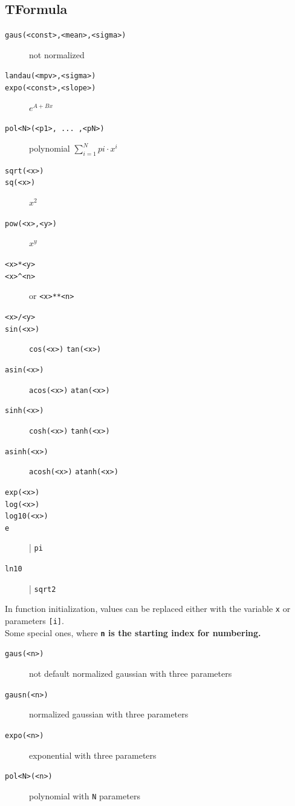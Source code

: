 \documentclass[10pt, twoside]{article}
\newcommand{\ttt}[1]{\colorbox{boxgray}{\texttt{#1}}}
\begin{document}
\subsection*{TFormula}
\begin{description}
\item[\ttt{gaus(<const>,<mean>,<sigma>)}] not normalized
\item[\ttt{landau(<mpv>,<sigma>)}]
\item[\ttt{expo(<const>,<slope>)}] $\displaystyle e^{A + Bx}$
\item[\ttt{pol<N>(<p1>, ... ,<pN>)}] polynomial $\displaystyle \sum_{i=1}^N pi \cdot x^i$ 
\item[\ttt{sqrt(<x>)}]
\item[\ttt{sq(<x>)}] $x^2$
\item[\ttt{pow(<x>,<y>)}] $x^y$
\item[\ttt{<x>*<y>}]
\item[\ttt{<x>\textasciicircum <n>}] or \ttt{<x>**<n>}
\item[\ttt{<x>/<y>}]
\item[\ttt{sin(<x>)}] \ttt{cos(<x>)} \ttt{tan(<x>)}
\item[\ttt{asin(<x>)}] \ttt{acos(<x>)} \ttt{atan(<x>)}
\item[\ttt{sinh(<x>)}] \ttt{cosh(<x>)} \ttt{tanh(<x>)}
\item[\ttt{asinh(<x>)}] \ttt{acosh(<x>)} \ttt{atanh(<x>)}
\item[\ttt{exp(<x>)}]
\item[\ttt{log(<x>)}]
\item[\ttt{log10(<x>)}]
\item[\ttt{e}] \quad \big| \quad \ttt{pi}
\item[\ttt{ln10}] \quad \big| \quad \ttt{sqrt2}
\end{description}
In function initialization, values can be replaced either with the variable \ttt{x} or parameters \ttt{[i]}.\\
Some special ones, where \textbf{\ttt{n} is the starting index for numbering.}
\begin{description}
\item[\ttt{gaus(<n>)}] not default normalized gaussian with three parameters
\item[\ttt{gausn(<n>)}] normalized gaussian with three parameters
\item[\ttt{expo(<n>)}] exponential with three parameters
\item[\ttt{pol<N>(<n>)}] polynomial with \ttt{N} parameters
\end{description}
\end{document}
